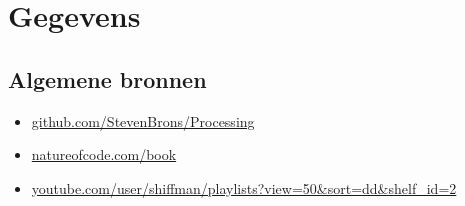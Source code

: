 \documentclass{article}
\begin{document}
\title{\tttt}
\author{Steven Bronsveld}

\maketitle
\section{Gegevens}

\subsection{Algemene bronnen}
\begin{itemize}
    \item \href{http://www.github.com/StevenBrons/Processing}{github.com/StevenBrons/Processing} 
    \item \href{https://natureofcode.com/book}{natureofcode.com/book} 
    \item \href{https://www.youtube.com/user/shiffman/playlists?view=50\&sort=dd\&shelf\_id=2}{youtube.com/user/shiffman/playlists?view=50\&sort=dd\&shelf\_id=2}
\end{itemize}


\newpage
\end{document}
